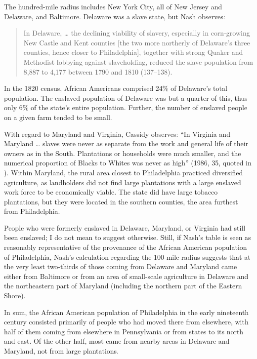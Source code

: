 \documentclass[output=paper,colorlinks,citecolor=brown]{langscibook}
\begin{document}
The hundred-mile radius includes New York City, all of New Jersey and Delaware, and Baltimore. Delaware was a slave state, but Nash observes: 
\begin{quote}
In Delaware, … the declining viability of slavery, especially in corn-growing New Castle and Kent counties [the two more northerly of Delaware’s three counties, hence closer to Philadelphia], together with strong Quaker and Methodist lobbying against slaveholding, reduced the slave population from 8,887 to 4,177 between 1790 and 1810 (137--138).
\end{quote}

In the 1820 census, African Americans comprised 24\% of Delaware’s total population. The enslaved population of Delaware was but a quarter of this, thus only 6\% of the state’s entire population. Further, the number of enslaved people on a given farm tended to be small.

With regard to Maryland and Virginia, Cassidy observes: “In Virginia and Maryland … slaves were never as separate from the work and general life of their owners as in the South. Plantations or households were much smaller, and the numerical proportion of Blacks to Whites was never as high” (1986, 35, quoted in \citealt[110]{Singler2015}). Within Maryland, the rural area closest to Philadelphia practiced diversified agriculture, as landholders did not find large plantations with a large enslaved work force to be economically viable. The state did have large tobacco plantations, but they were located in the southern counties, the area furthest from Philadelphia. 

People who were formerly enslaved in Delaware, Maryland, or Virginia had still been enslaved; I do not mean to suggest otherwise. Still, if Nash’s table is seen as reasonably representative of the provenance of the African American population of Philadelphia, Nash’s calculation regarding the 100-mile radius suggests that at the very least two-thirds of those coming from Delaware and Maryland came either from Baltimore or from an area of small-scale agriculture in Delaware and the northeastern part of Maryland (including the northern part of the Eastern Shore).

In sum, the African American population of Philadelphia in the early nineteenth century consisted primarily of people who had moved there from elsewhere, with half of them coming from elsewhere in Pennsylvania or from states to its north and east. Of the other half, most came from nearby areas in Delaware and Maryland, not from large plantations. 
\end{document}
